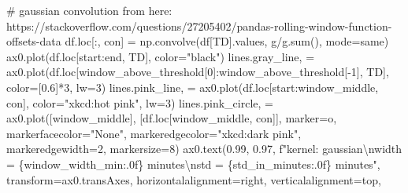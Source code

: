 \documentclass[
  letterpaper,
  DIV=11,
  numbers=noendperiod,
  oneside]{scrreprt}
\newenvironment{Shaded}{\begin{snugshade}}{\end{snugshade}}
\newcommand{\BuiltInTok}[1]{\textcolor[rgb]{0.00,0.23,0.31}{#1}}
\newcommand{\CharTok}[1]{\textcolor[rgb]{0.13,0.47,0.30}{#1}}
\newcommand{\CommentTok}[1]{\textcolor[rgb]{0.37,0.37,0.37}{#1}}
\newcommand{\DecValTok}[1]{\textcolor[rgb]{0.68,0.00,0.00}{#1}}
\newcommand{\FloatTok}[1]{\textcolor[rgb]{0.68,0.00,0.00}{#1}}
\newcommand{\NormalTok}[1]{\textcolor[rgb]{0.00,0.23,0.31}{#1}}
\newcommand{\OperatorTok}[1]{\textcolor[rgb]{0.37,0.37,0.37}{#1}}
\newcommand{\SpecialCharTok}[1]{\textcolor[rgb]{0.37,0.37,0.37}{#1}}
\newcommand{\SpecialStringTok}[1]{\textcolor[rgb]{0.13,0.47,0.30}{#1}}
\newcommand{\StringTok}[1]{\textcolor[rgb]{0.13,0.47,0.30}{#1}}
\begin{document}
\begin{Shaded}
\begin{Highlighting}[]
\CommentTok{\# gaussian convolution from here: https://stackoverflow.com/questions/27205402/pandas{-}rolling{-}window{-}function{-}offsets{-}data}
\NormalTok{df.loc[:, }\StringTok{\textquotesingle{}con\textquotesingle{}}\NormalTok{] }\OperatorTok{=}\NormalTok{ np.convolve(df[}\StringTok{\textquotesingle{}TD\textquotesingle{}}\NormalTok{].values, g}\OperatorTok{/}\NormalTok{g.}\BuiltInTok{sum}\NormalTok{(), mode}\OperatorTok{=}\StringTok{\textquotesingle{}same\textquotesingle{}}\NormalTok{)}
\NormalTok{ax0.plot(df.loc[start:end, }\StringTok{\textquotesingle{}TD\textquotesingle{}}\NormalTok{], color}\OperatorTok{=}\StringTok{"black"}\NormalTok{)}
\NormalTok{lines.gray\_line, }\OperatorTok{=}\NormalTok{ ax0.plot(df.loc[window\_above\_threshold[}\DecValTok{0}\NormalTok{]:window\_above\_threshold[}\OperatorTok{{-}}\DecValTok{1}\NormalTok{], }\StringTok{\textquotesingle{}TD\textquotesingle{}}\NormalTok{],}
\NormalTok{                     color}\OperatorTok{=}\NormalTok{[}\FloatTok{0.6}\NormalTok{]}\OperatorTok{*}\DecValTok{3}\NormalTok{, lw}\OperatorTok{=}\DecValTok{3}\NormalTok{)}
\NormalTok{lines.pink\_line, }\OperatorTok{=}\NormalTok{ ax0.plot(df.loc[start:window\_middle, }\StringTok{\textquotesingle{}con\textquotesingle{}}\NormalTok{], color}\OperatorTok{=}\StringTok{"xkcd:hot pink"}\NormalTok{, lw}\OperatorTok{=}\DecValTok{3}\NormalTok{)}
\NormalTok{lines.pink\_circle, }\OperatorTok{=}\NormalTok{ ax0.plot([window\_middle], [df.loc[window\_middle, }\StringTok{\textquotesingle{}con\textquotesingle{}}\NormalTok{]],}
\NormalTok{         marker}\OperatorTok{=}\StringTok{\textquotesingle{}o\textquotesingle{}}\NormalTok{, markerfacecolor}\OperatorTok{=}\StringTok{"None"}\NormalTok{, markeredgecolor}\OperatorTok{=}\StringTok{"xkcd:dark pink"}\NormalTok{, markeredgewidth}\OperatorTok{=}\DecValTok{2}\NormalTok{,}
\NormalTok{         markersize}\OperatorTok{=}\DecValTok{8}\NormalTok{)}
\NormalTok{ax0.text(}\FloatTok{0.99}\NormalTok{, }\FloatTok{0.97}\NormalTok{, }\SpecialStringTok{f"kernel: gaussian}\CharTok{\textbackslash{}n}\SpecialStringTok{width = }\SpecialCharTok{\{}\NormalTok{window\_width\_min}\SpecialCharTok{:.0f\}}\SpecialStringTok{ minutes}\CharTok{\textbackslash{}n}\SpecialStringTok{std = }\SpecialCharTok{\{}\NormalTok{std\_in\_minutes}\SpecialCharTok{:.0f\}}\SpecialStringTok{ minutes"}\NormalTok{, transform}\OperatorTok{=}\NormalTok{ax0.transAxes,}
\NormalTok{         horizontalalignment}\OperatorTok{=}\StringTok{\textquotesingle{}right\textquotesingle{}}\NormalTok{, verticalalignment}\OperatorTok{=}\StringTok{\textquotesingle{}top\textquotesingle{}}\NormalTok{,}

\end{Highlighting}
\end{Shaded}
\end{document}
